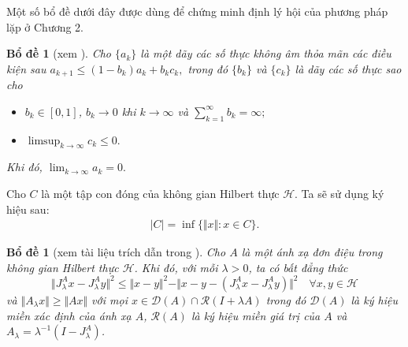 \documentclass[14pt, oneside,A4paper]{book}
\theoremstyle{plain}
\newtheorem{bd}[theorem]{Bổ đề}
\begin{document}


Một số bổ đề dưới đây được dùng để chứng minh định lý hội của phương pháp lặp ở Chương 2.

\begin{bd}[xem \cite{AS}] \label{bd2.2.3}
	Cho $\{a_{k}\}$ là một dãy các số thực không âm thỏa mãn các điều kiện sau $a_{k+1} \leq (1-b_{k})a_{k}+b_{k}c_{k},$ trong đó $\lbrace b_{k} \rbrace$ và $\lbrace c_{k} \rbrace$ là dãy các số thực sao cho
	\begin{itemize}
		\item[$(i)$]$b_{k} \in [0,1]$, $b_{k} \rightarrow 0 $ khi $k \rightarrow \infty$ và $\sum_{k=1}^{\infty}b_{k}=\infty;$
		\item[$(ii)$]$\limsup_{k \rightarrow \infty}c_{k}\leq 0.$
	\end{itemize}
	Khi đó, $\lim_{k\rightarrow \infty}a_{k}=0.$
\end{bd}

	Cho $C$ là một tập con đóng của không gian Hilbert thực $\mathcal H$. Ta sẽ sử dụng ký hiệu sau:
\begin{align*}
\vert C\vert=\inf \lbrace \Vert x \Vert : x \in C \rbrace.
\end{align*}

\begin{bd}[xem tài liệu trích dẫn trong \cite{BHN}] \label{bd2.2.4}
	Cho $A$ là một ánh xạ đơn điệu trong không gian Hilbert thực $\mathcal H$. Khi đó, với mỗi $\lambda > 0$, ta có bất đẳng thức
	$$\Vert J^A_{\lambda}x-J^A_{\lambda}y \Vert^{2} \leq \Vert x-y \Vert^{2} - \Vert x-y-(J^A_{\lambda}x-J^A_{\lambda}y) \Vert^{2} \quad \forall x,y \in \mathcal H $$
	và $ \Vert A_{\lambda}x\Vert \geq \Vert Ax \Vert$ với mọi $x \in \mathcal{D}(A)\cap \mathcal{R}(I+\lambda A)$ trong đó $\mathcal D(A)$ là ký hiệu miền xác định của ánh xạ $A$, $\mathcal R(A)$ là ký hiệu miền giá trị của $A$ và $A_{\lambda}=\lambda ^{-1}(I-J^A_{\lambda})$.
\end{bd}

\end{document}
